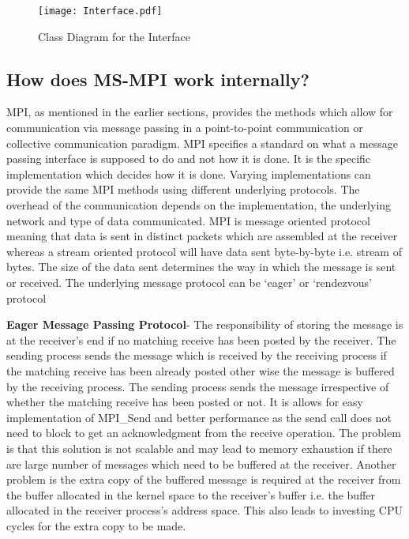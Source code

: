 \begin{figure}[ht!]
\centering
\texttt{[image: Interface.pdf]}
\caption{Class Diagram for the Interface}
\label{fig:InterfaceDiagram}
\end{figure}


\subsection{How does MS-MPI work internally?}

MPI, as mentioned in the earlier sections, provides the methods which allow for communication via message passing in a point-to-point communication or collective communication paradigm. MPI specifies a standard on what a message passing interface is supposed to do and not how it is done. It is the specific implementation which decides how it is done. Varying implementations can provide the same MPI methods using different underlying protocols. The overhead of the communication depends on the implementation, the underlying network and type of data communicated. MPI is message oriented protocol meaning that data is sent in distinct packets which are assembled at the receiver whereas a stream oriented protocol will have data sent byte-by-byte i.e. stream of bytes. The size of the data sent determines the way in which the message is sent or received. The underlying message protocol can be {\lq}eager{\rq} or {\lq}rendezvous{\rq} protocol\newline 

\textbf{Eager Message Passing Protocol}- The responsibility of storing the message is at the receiver's end if no matching receive has been posted by the receiver. The sending process sends the message which is received by the receiving process if the matching receive has been already posted other wise the message is buffered by the receiving process. The sending process sends the message irrespective of whether the matching receive has been posted or not. It is allows for easy implementation of MPI\_Send and better performance as the send call does not need to block to get an acknowledgment from the receive operation. The problem is that this solution is not scalable and may lead to memory exhaustion if there are large number of messages which need to be buffered at the receiver. Another problem is the extra copy of the buffered message is required at the receiver from the buffer allocated in the kernel space to the receiver's buffer i.e. the buffer allocated  in the receiver process's address space. This also leads to investing CPU cycles for the extra copy to be made.       


